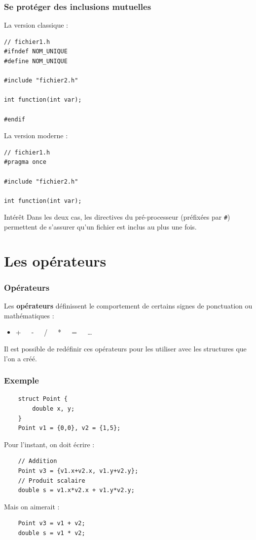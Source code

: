 \begin{frame}[fragile=singleslide]
	\frametitle{Se protéger des inclusions mutuelles}
    
\begin{minipage}{0.49\linewidth}
	La version classique :
    \begin{verbatim}
// fichier1.h
#ifndef NOM_UNIQUE
#define NOM_UNIQUE

#include "fichier2.h"

int function(int var);

#endif
	\end{verbatim}
\end{minipage}
\begin{minipage}{0.49\linewidth}
	La version moderne :
    \begin{verbatim}
// fichier1.h
#pragma once

#include "fichier2.h"

int function(int var);
	\end{verbatim}
\end{minipage}

\begin{block}{Intérêt}
Dans les deux cas, les directives du pré-processeur (préfixées par \texttt{\#}) permettent de s'assurer qu'un fichier est inclus au plus une fois.
\end{block}

\end{frame}

\section{Les opérateurs}

\begin{frame}
\frametitle{Opérateurs}
Les \textbf{opérateurs} définissent le comportement de certains signes de ponctuation ou mathématiques : 
\begin{itemize}
\item +~~~-~~~/~~~*~~~=~~~\dots
\end{itemize}

Il est possible de redéfinir ces opérateurs pour les utiliser avec les structures que l'on a créé.
\end{frame}

\begin{frame}[fragile=singleslide]
\frametitle{Exemple}
	\begin{verbatim}
	struct Point {
		double x, y;
	}
	Point v1 = {0,0}, v2 = {1,5};
    \end{verbatim}
    Pour l'instant, on doit écrire :
    \begin{verbatim}	
	// Addition
	Point v3 = {v1.x+v2.x, v1.y+v2.y};
	// Produit scalaire
	double s = v1.x*v2.x + v1.y*v2.y;
    \end{verbatim}
    Mais on aimerait :
    \begin{verbatim}	
	Point v3 = v1 + v2;
	double s = v1 * v2;
    \end{verbatim}
\end{frame}


